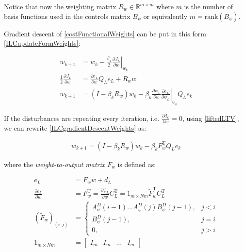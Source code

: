 \documentclass[10pt,a4paper]{article}
\newcommand\at[2]{\left.#1\right|_{#2}} %
\newcommand{\error}{e} %
\newcommand{\linDist}{d} %
\newcommand{\fullvec}{\psi} %
\newcommand{\weights}{w} %
\newcommand{\ValueFunction}{J}
\begin{document}
Notice that now the weighting matrix $R_w \in \mathbb{R}^{m \times m}$ where $m$ is the number of basis functions used in the controls matrix $B_{\fullvec}$ or equivalently $m = \text{rank}(B_{\fullvec})$.

Gradient descent of \eqref{costFunctionalWeights} can be put in this form \eqref{ILCupdateFormWeights}:

\begin{equation}
\begin{aligned}
\weights_{k+1} &= \weights_k - \frac{\beta_k}{2} \at{\frac{\partial{\ValueFunction_L}}{\partial{\weights}}}{\weights_k} \\
\frac{1}{2}\frac{\partial{\ValueFunction_L}}{\partial{\weights}} &= \frac{\partial{\error_L}}{\partial{\weights}}Q_L\error_L + R_{\weights}\weights \\
\weights_{k+1} &= (I - \beta_kR_{\weights})\weights_k - \beta_k\frac{\partial{\fullvec_L}}{\partial{\weights}}\at{\frac{\partial{\error_L}}{\partial{\fullvec_L}}}{\fullvec_k}Q_L\error_k
\end{aligned}
\label{ILCgradientDescentWeights}
\end{equation}

If the disturbances are repeating every iteration, i.e. $\frac{\partial{\linDist_L}}{\partial{\weights}} = 0$, using \eqref{liftedLTV}, we can rewrite \eqref{ILCgradientDescentWeights} as:

\begin{equation}
\begin{aligned}
\weights_{k+1} = (I - \beta_kR_{\weights})\weights_k - \beta_kF_{\weights}^\mathrm{T}Q_L\error_k
\end{aligned}
\label{ILCgradientDescentWeights2}
\end{equation}

where the \emph{weight-to-output matrix} $F_{\weights}$ is defined as:

\begin{equation}
\begin{aligned}
\error_L &= F_{\weights}\weights + \linDist_L \\
\frac{\partial{\error_L}}{\partial{\weights}} &= F_{\weights}^{\mathrm{T}} = \frac{\partial{\fullvec_L}}{\partial{\weights}}C_L^{\mathrm{T}} = 1_{m\times Nm}\tilde{F}_{\weights}^{\mathrm{T}}C_L^{\mathrm{T}} \\
(\tilde{F}_{\weights})_{(i,j)} &= \left \{
\begin{array}{cc}
A^{D}_{\fullvec}(i-1)\ldots A^{D}_{\fullvec}(j)B^{D}_{\fullvec}(j-1), & j < i \\ 
B^{D}_{\fullvec}(j-1), & j = i \\
0, & j > i 
\end{array} \right. \\
1_{m\times Nm} &= \begin{bmatrix}
  I_{m} & I_{m} & \ldots & I_{m}
 \end{bmatrix}
\end{aligned}
\label{weightToOutputMatrix}
\end{equation}
\end{document}
